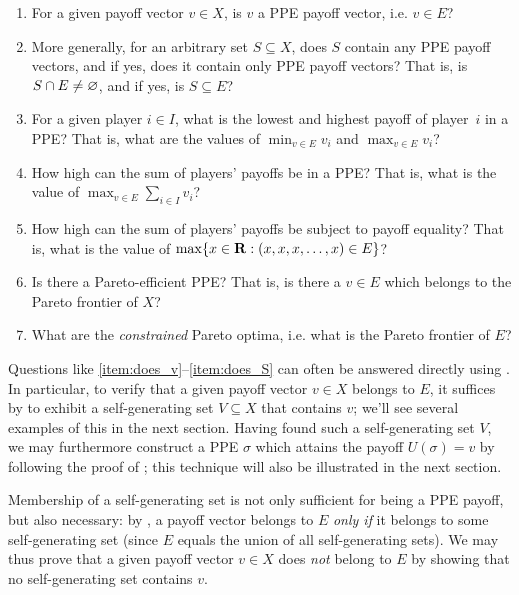 \begin{enumerate}

	\item \label{item:does_v} For a given payoff vector $v \in X$, is $v$ a PPE payoff vector, i.e. $v \in E$?

	\item \label{item:does_S} More generally, for an arbitrary set $S \subseteq X$, does $S$ contain any PPE payoff vectors, and if yes, does it contain only PPE payoff vectors? That is, is $S \cap E \neq \varnothing$, and if yes, is $S \subseteq E$?

	\item \label{item:does_max1} For a given player $i \in I$, what is the lowest and highest payoff of player~$i$ in a PPE? That is, what are the values of $\min_{v \in E} v_i$ and $\max_{v \in E} v_i$?

	\item \label{item:does_max2} How high can the sum of players' payoffs be in a PPE? That is, what is the value of $\max_{v \in E} \sum_{i \in I} v_i$?

	\item \label{item:does_max3} How high can the sum of players' payoffs be subject to payoff equality? That is, what is the value of $\max \{ x \in \mathbf{R} : (x,x,x,\dots,x) \in E \}$?

	\item \label{item:does_max4} Is there a Pareto-efficient PPE? That is, is there a $v \in E$ which belongs to the Pareto frontier of $X$?

	\item \label{item:does_max5} What are the \emph{constrained} Pareto optima, i.e. what is the Pareto frontier of $E$?

\end{enumerate}

Questions like \ref{item:does_v}--\ref{item:does_S} can often be answered directly using . In particular, to verify that a given payoff vector $v \in X$ belongs to $E$, it suffices by  to exhibit a self-generating set $V \subseteq X$ that contains $v$; we'll see several examples of this in the next section. Having found such a self-generating set $V$, we may furthermore construct a PPE $\sigma$ which attains the payoff $U(\sigma)=v$ by following the proof of ; this technique will also be illustrated in the next section.

Membership of a self-generating set is not only sufficient for being a PPE payoff, but also necessary: by , a payoff vector belongs to $E$ \emph{only if} it belongs to some self-generating set (since $E$ equals the union of all self-generating sets). We may thus prove that a given payoff vector $v \in X$ does \emph{not} belong to $E$ by showing that no self-generating set contains $v$.

